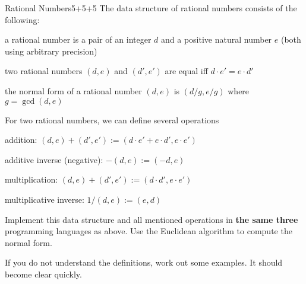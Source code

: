 \documentclass[a4paper]{article}
\begin{document}
\begin{problem}{Rational Numbers}{5+5+5}
The data structure of rational numbers consists of the following:
\begin{compactitem}
  \item a rational number is a pair of an integer $d$ and a positive natural number $e$ (both using arbitrary precision)
  \item two rational numbers $(d,e)$ and $(d',e')$ are equal iff $d\cdot e'=e\cdot d'$
  \item the normal form of a rational number $(d,e)$ is $(d/g, e/g)$ where $g=\gcd(d,e)$ \\
\end{compactitem}

For two rational numbers, we can define several operations
\begin{compactitem}
 \item addition: $(d,e)+(d',e'):=(d\cdot e'+e\cdot d', e\cdot e')$
 \item additive inverse (negative): $-(d,e):=(-d,e)$
 \item multiplication: $(d,e)+(d',e'):=(d\cdot d', e\cdot e')$
 \item multiplicative inverse: $1/(d,e):=(e,d)$
\end{compactitem}

Implement this data structure and all mentioned operations in \textbf{the same three} programming languages as above.
Use the Euclidean algorithm to compute the normal form.

\begin{hint}
If you do not understand the definitions, work out some examples. It should become clear quickly.
\end{hint}
\end{problem}
\end{document}
